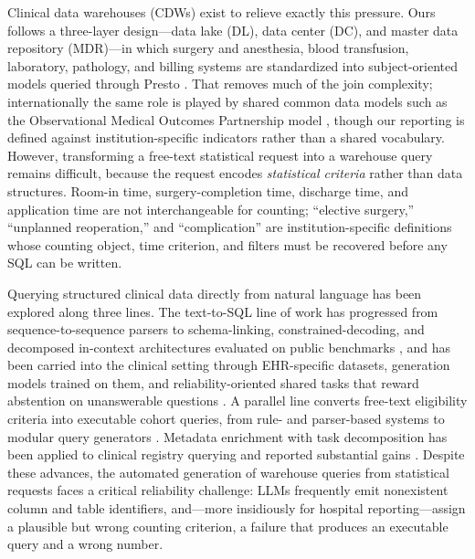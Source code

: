 \documentclass[10pt,twocolumn]{article}
\begin{document}
Clinical data warehouses (CDWs) exist to relieve exactly this pressure. Ours follows a three-layer design---data lake (DL), data center (DC), and master data repository (MDR)---in which surgery and anesthesia, blood transfusion, laboratory, pathology, and billing systems are standardized into subject-oriented models queried through Presto \cite{presto2019}. That removes much of the join complexity; internationally the same role is played by shared common data models such as the Observational Medical Outcomes Partnership model \cite{ohdsi2015}, though our reporting is defined against institution-specific indicators rather than a shared vocabulary. However, transforming a free-text
statistical request into a warehouse query remains difficult, because the
request encodes \emph{statistical criteria} rather than data structures. Room-in
time, surgery-completion time, discharge time, and application time are not
interchangeable for counting; ``elective surgery,'' ``unplanned reoperation,''
and ``complication'' are institution-specific definitions whose counting object,
time criterion, and filters must be recovered before any SQL can be written.

Querying structured clinical data directly from natural language has been explored along three lines. The text-to-SQL line of
work has progressed from sequence-to-sequence parsers to schema-linking,
constrained-decoding, and decomposed in-context architectures evaluated on public
benchmarks \cite{zhong2017,yu2018,wang2020,scholak2021,pourreza2023,bird2023,dailsql2024,macsql2024},
and has been carried into the clinical setting through EHR-specific datasets,
generation models trained on them, and reliability-oriented shared tasks that
reward abstention on unanswerable questions
\cite{treqs2020,medts2021,ehrsql2024,ragepi2024,rag2step2025}. A parallel line
converts free-text eligibility criteria into executable cohort queries, from
rule- and parser-based systems to modular query generators
\cite{c2q2019,trialpath2021,leafai2023}. Metadata enrichment with task
decomposition has been applied to clinical registry querying and reported
substantial gains \cite{metaclin2025}. Despite these advances, the automated generation of warehouse
queries from statistical requests faces a critical reliability challenge: LLMs
frequently emit nonexistent column and table identifiers, and---more insidiously
for hospital reporting---assign a plausible but wrong counting criterion, a
failure that produces an executable query and a wrong number.
\end{document}
